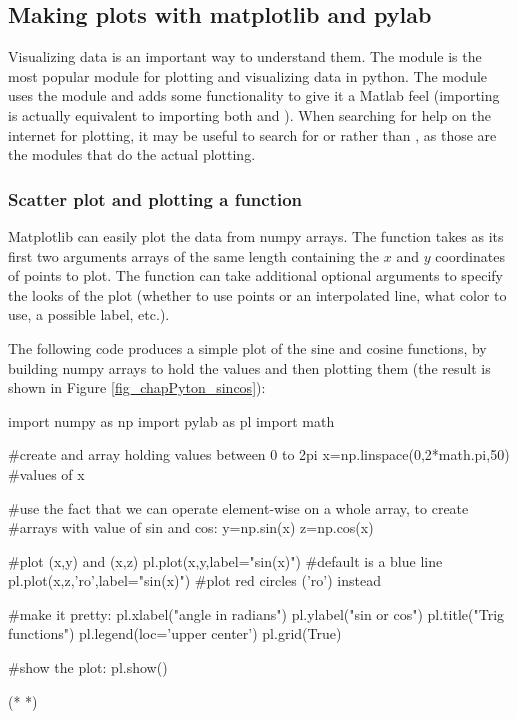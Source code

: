 \subsection{Making plots with matplotlib and pylab}
Visualizing data is an important way to understand them. The  module is the most popular module for plotting and visualizing data in python. The  module uses the  module and adds some functionality to give it a Matlab feel (importing  is actually equivalent to importing both  and ). When searching for help on the internet for plotting, it may be useful to search for  or  rather than , as those are the modules that do the actual plotting.

\subsubsection{Scatter plot and plotting a function}
Matplotlib can easily plot the data from numpy arrays. The  function takes as its first two arguments arrays of the same length containing the $x$ and $y$ coordinates of points to plot. The function can take additional optional arguments to specify the looks of the plot (whether to use points or an interpolated line, what color to use, a possible label, etc.).

The following code produces a simple plot of the sine and cosine functions, by building numpy arrays to hold the values and then plotting them (the result is shown in Figure \ref{fig_chapPyton_sincos}):

\begin{python}[caption = Pylab to make a scatter plot and plot a function]
import numpy as np
import pylab as pl
import math 

#create  and array holding values between 0 to 2pi
x=np.linspace(0,2*math.pi,50) #values of x

#use the fact that we can operate element-wise on a whole array, to create
#arrays with value of sin and cos:
y=np.sin(x)
z=np.cos(x)

#plot (x,y) and (x,z)
pl.plot(x,y,label="sin(x)") #default is a blue line
pl.plot(x,z,'ro',label="sin(x)") #plot red circles ('ro') instead

#make it pretty:
pl.xlabel("angle in radians")
pl.ylabel("sin or cos")
pl.title("Trig functions")
pl.legend(loc='upper center')
pl.grid(True)

#show the plot:
pl.show()
\end{python} 
\begin{poutput}
(*  *)
\end{poutput}
